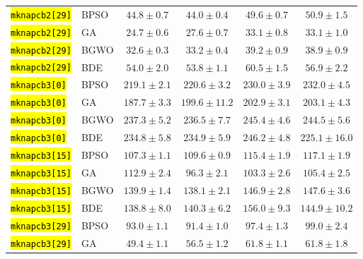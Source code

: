 \documentclass[mathematics,article,accept,moreauthors]{Definitions/mdpi}
\begin{document}
\begin{table}[H]
\begin{tabularx}{\textwidth}{XLCCCC}
    \texttt{\hl{mknapcb2[29]}} & BPSO  &           $44.8 \pm 0.7$ &  $\mathbf{44.0 \pm 0.4}$ &           $49.6 \pm 0.7$ &           $50.9 \pm 1.5$ \\
    \texttt{\hl{mknapcb2[29]}} & GA    &  $\mathbf{24.7 \pm 0.6}$ &           $27.6 \pm 0.7$ &           $33.1 \pm 0.8$ &           $33.1 \pm 1.0$ \\
    \texttt{\hl{mknapcb2[29]}} & BGWO  &  $\mathbf{32.6 \pm 0.3}$ &           $33.2 \pm 0.4$ &           $39.2 \pm 0.9$ &           $38.9 \pm 0.9$ \\
    \texttt{\hl{mknapcb2[29]}} & BDE   &           $54.0 \pm 2.0$ &  $\mathbf{53.8 \pm 1.1}$ &           $60.5 \pm 1.5$ &           $56.9 \pm 2.2$ \\
    \midrule
    \texttt{\hl{mknapcb3[0]}} & BPSO  & $\mathbf{219.1 \pm 2.1}$ &          $220.6 \pm 3.2$ &          $230.0 \pm 3.9$ &          $232.0 \pm 4.5$ \\
    \texttt{\hl{mknapcb3[0]}} & GA    & $\mathbf{187.7 \pm 3.3}$ &         $199.6 \pm 11.2$ &          $202.9 \pm 3.1$ &          $203.1 \pm 4.3$ \\
    \texttt{\hl{mknapcb3[0]}} & BGWO  &          $237.3 \pm 5.2$ & $\mathbf{236.5 \pm 7.7}$ &          $245.4 \pm 4.6$ &          $244.5 \pm 5.6$ \\
    \texttt{\hl{mknapcb3[0]}} & BDE   &          $234.8 \pm 5.8$ &          $234.9 \pm 5.9$ &          $246.2 \pm 4.8$ & $\mathbf{225.1 \pm 16.0}$ \\
    \midrule
    \texttt{\hl{mknapcb3[15]}} & BPSO  & $\mathbf{107.3 \pm 1.1}$ &          $109.6 \pm 0.9$ &          $115.4 \pm 1.9$ &          $117.1 \pm 1.9$ \\
    \texttt{\hl{mknapcb3[15]}} & GA    &          $112.9 \pm 2.4$ &  $\mathbf{96.3 \pm 2.1}$ &          $103.3 \pm 2.6$ &          $105.4 \pm 2.5$ \\
    \texttt{\hl{mknapcb3[15]}} & BGWO  &          $139.9 \pm 1.4$ & $\mathbf{138.1 \pm 2.1}$ &          $146.9 \pm 2.8$ &          $147.6 \pm 3.6$ \\
    \texttt{\hl{mknapcb3[15]}} & BDE   & $\mathbf{138.8 \pm 8.0}$ &          $140.3 \pm 6.2$ &          $156.0 \pm 9.3$ &         $144.9 \pm 10.2$ \\
    \midrule
    \texttt{\hl{mknapcb3[29]}} & BPSO  &           $93.0 \pm 1.1$ &  $\mathbf{91.4 \pm 1.0}$ &           $97.4 \pm 1.3$ &           $99.0 \pm 2.4$ \\
    \texttt{\hl{mknapcb3[29]}} & GA    &  $\mathbf{49.4 \pm 1.1}$ &           $56.5 \pm 1.2$ &           $61.8 \pm 1.1$ &           $61.8 \pm 1.8$ \\

\end{tabularx}
\end{table}
\end{document}
